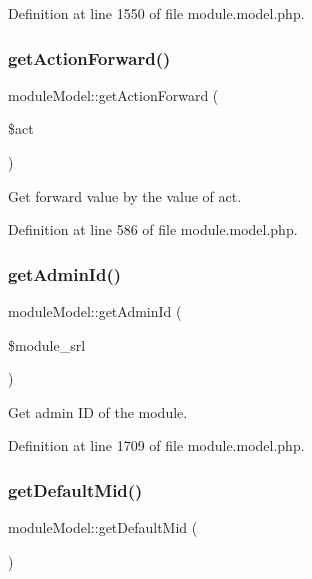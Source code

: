 Definition at line 1550 of file module.\+model.\+php.

\mbox{\label{classmoduleModel_a2a06b59fa663c1e79f81aac571e2e5c8}} 
\subsubsection{\texorpdfstring{get\+Action\+Forward()}{getActionForward()}}
{\footnotesize\ttfamily module\+Model\+::get\+Action\+Forward (\begin{DoxyParamCaption}\item[{}]{\$act }\end{DoxyParamCaption})}



Get forward value by the value of act. 



Definition at line 586 of file module.\+model.\+php.

\mbox{\label{classmoduleModel_a302d180d2acef6331f9123d60f76c8c1}} 
\subsubsection{\texorpdfstring{get\+Admin\+Id()}{getAdminId()}}
{\footnotesize\ttfamily module\+Model\+::get\+Admin\+Id (\begin{DoxyParamCaption}\item[{}]{\$module\+\_\+srl }\end{DoxyParamCaption})}



Get admin ID of the module. 



Definition at line 1709 of file module.\+model.\+php.

\mbox{\label{classmoduleModel_ae76b5be74783d11b676b167ba2c63523}} 
\subsubsection{\texorpdfstring{get\+Default\+Mid()}{getDefaultMid()}}
{\footnotesize\ttfamily module\+Model\+::get\+Default\+Mid (\begin{DoxyParamCaption}{ }\end{DoxyParamCaption})}



